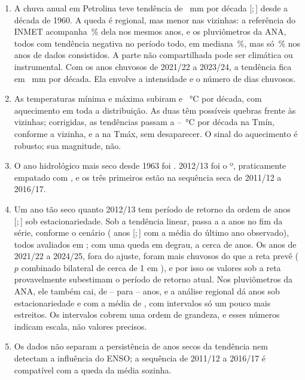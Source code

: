 \documentclass[11pt,a4paper]{article}
\newcommand{\IC}[2]{[#1;\,#2]}            %
\begin{document}
\begin{enumerate}
  \item A chuva anual em Petrolina teve tendência de \SenChuva{}~mm por década
  \IC{\SenChuvaICinf}{\SenChuvaICsup} desde a década de 1960. A queda é regional, mas menor nas
  vizinhas: a referência do INMET acompanha \PctRefEst{}\,\% dela nos mesmos anos, e os pluviômetros da
  ANA, todos com tendência negativa no período todo, em mediana \RazaoSenAnaMediana{}\,\%, mas só
  \RazaoSenAnaConsMediana{}\,\% nos anos de dados consistidos. A parte não compartilhada
  pode ser climática ou instrumental. Com os anos chuvosos de 2021/22 a 2023/24, a tendência fica em
  \SenChuvaRecentes{}~mm por década. Ela envolve a intensidade e o número de dias chuvosos.
  \item As temperaturas mínima e máxima subiram \SenTmin{} e \SenTmax{}~°C por década, com aquecimento
  em toda a distribuição. As duas têm possíveis quebras frente às vizinhas; corrigidas, as tendências
  passam a \SenTminAjustada{}--\SenTminAjustadaCabrobo{}~°C por década na Tmín, conforme a vizinha, e a
  \SenTmaxAjustada{} na Tmáx, sem desaparecer. O sinal do aquecimento é
  robusto; sua magnitude, não.
  \item O ano hidrológico mais seco desde 1963 foi \AnoMinimo{}. 2012/13 foi o
  \RankDozeTreze{}º, praticamente empatado com \RankAnotres{}, e os três primeiros estão na
  sequência seca de 2011/12 a 2016/17.
  \item Um ano tão seco quanto 2012/13 tem período de retorno da ordem de \TMediaAkaikeB{} anos
  \IC{\TMediaAkaikeBICinf}{\TMediaAkaikeBICsup} sob estacionariedade. Sob a tendência linear, passa a
  \TNSFaixaMin{} a \TNSFaixaMax{} anos no fim da série, conforme o cenário (\TNSMediaUlt{} anos
  \IC{\TNSMediaUltICinf}{\TNSMediaUltICsup} com a média do último ano observado), todos avaliados em
  \UltimoAnoNS{}; com uma queda em degrau, a cerca de \TFormaDegrau{} anos. Os anos de 2021/22 a
  2024/25, fora do ajuste, foram mais chuvosos do que a reta prevê ($p$ combinado bilateral de cerca de
  1 em \PRecFisherBilPredInv{}), e por isso os valores sob a reta provavelmente subestimam o período de
  retorno atual. Nos \NAnaRetorno{} pluviômetros da ANA, ele também cai, de
  \TEstAnaMin{}--\TEstAnaMax{} para \TNSAnaMin{}--\TNSAnaMax{} anos, e a análise regional dá
  \TRegEst{} anos sob estacionariedade e \TRegNS{} com a média de \UltimoAnoNS{}, com intervalos só um
  pouco mais estreitos. Os intervalos cobrem uma ordem de grandeza, e esses números indicam escala,
  não valores precisos.
  \item Os dados não separam a persistência de anos secos da tendência nem detectam a influência
  do ENSO; a sequência de 2011/12 a 2016/17 é compatível com a queda da média sozinha.
\end{enumerate}
\end{document}
